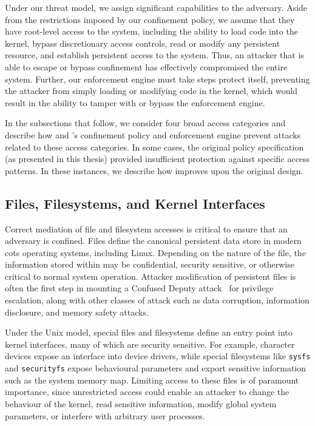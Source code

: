 Under our threat model, we assign significant capabilities to the adversary. Aside from the
restrictions imposed by our confinement policy, we assume that they have root-level access
to the system, including the ability to load code into the kernel, bypass discretionary
access controls, read or modify any persistent resource, and establish persistent access
to the system. Thus, an attacker that is able to escape or bypass confinement has
effectively compromised the entire system. Further, our enforcement engine must take steps
protect itself, preventing the attacker from simply loading or modifying code in the
kernel, which would result in the ability to tamper with or bypass the enforcement engine.

In the subsections that follow, we consider four broad access categories and describe how
\bpfbox{} and \bpfcontain{}'s confinement policy and enforcement engine prevent attacks
related to these access categories. In some cases, the original \bpfbox{} policy
specification (as presented in this thesis) provided insufficient protection against
specific access patterns. In these instances, we describe how \bpfcontain{} improves upon
the original \bpfbox{} design.

\subsection{Files, Filesystems, and Kernel Interfaces}

Correct mediation of file and filesystem accesses is critical to ensure that an adversary
is confined. Files define the canonical persistent data store in modern \gls{cots}
operating systems, including Linux. Depending on the nature of the file, the information
stored within may be confidential, security sensitive, or otherwise critical to normal
system operation. Attacker modification of persistent files is often the first step in
mounting a Confused Deputy attack~\cite{hardy1988_confused_deputy} for privilege
escalation, along with other classes of attack such as data corruption, information
disclosure, and memory safety attacks.

Under the Unix model, special files and filesystems define an entry point into kernel
interfaces, many of which are security sensitive. For example, character devices expose an
interface into device drivers, while special filesystems like \texttt{sysfs} and
\texttt{securityfs} expose behavioural parameters and export sensitive information such as
the system memory map. Limiting access to these files is of paramount importance, since
unrestricted access could enable an attacker to change the behaviour of the kernel, read
sensitive information, modify global system parameters, or interfere with arbitrary user
processes.

